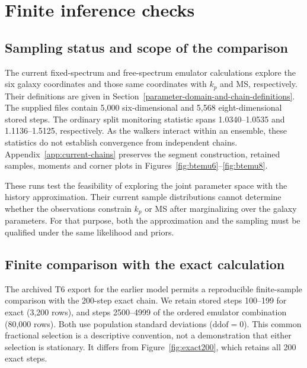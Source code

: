 \section{Finite inference checks}\label{inference-status}

\subsection{Sampling status and scope of the comparison}

The current fixed-spectrum and free-spectrum emulator calculations explore the six galaxy coordinates and those same coordinates with $k_p$ and MS, respectively. Their definitions are given in Section~\ref{parameter-domain-and-chain-definitions}. The supplied files contain 5,000 six-dimensional and 5,568 eight-dimensional stored steps. The ordinary split monitoring statistic spans 1.0340--1.0535 and 1.1136--1.5125, respectively. As the walkers interact within an ensemble, these statistics do not establish convergence from independent chains. Appendix~\ref{app:current-chains} preserves the segment construction, retained samples, moments and corner plots in Figures~\ref{fig:btemu6}--\ref{fig:btemu8}.

These runs test the feasibility of exploring the joint parameter space with the history approximation. Their current sample distributions cannot determine whether the observations constrain $k_p$ or MS after marginalizing over the galaxy parameters. For that purpose, both the approximation and the sampling must be qualified under the same likelihood and priors.

\subsection{Finite comparison with the exact calculation}

The archived T6 export for the earlier model permits a reproducible finite-sample comparison with the 200-step exact chain. We retain stored steps 100--199 for exact (3,200 rows), and steps 2500--4999 of the ordered emulator combination (80,000 rows). Both use population standard deviations ($\mathrm{ddof}=0$). This common fractional selection is a descriptive convention, not a demonstration that either selection is stationary. It differs from Figure~\ref{fig:exact200}, which retains all 200 exact steps.

